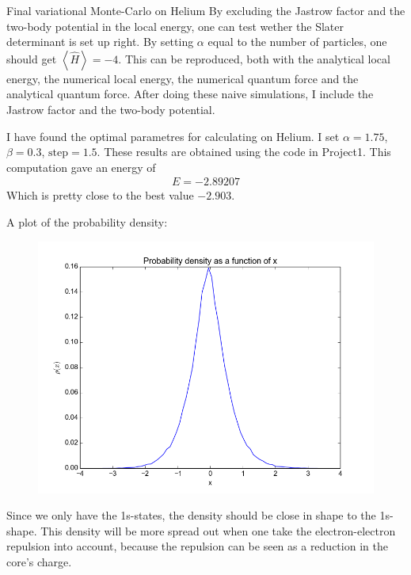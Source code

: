 \documentclass[a4paper, 12pt, titlepage]{article}
\begin{document}
\begin{section}{Final variational Monte-Carlo on Helium}
 By excluding the Jastrow factor and the two-body potential in the local energy, one can test wether the Slater determinant is set up right. By setting $\alpha$ equal to the number of particles, one should get $\left< \hat H \right> = -4$. This can be reproduced, both with the analytical local energy, the numerical local energy, the numerical quantum force and the analytical quantum force. After doing these naive simulations, I include the Jastrow factor and the two-body potential. 

 I have found the optimal parametres for calculating on Helium. I set $\alpha = 1.75$, $\beta = 0.3$, $\text{step} = 1.5$. These results are obtained using the code in Project1. This computation gave an energy of
 \begin{align*}
 	E = -2.89207
 \end{align*}
 Which is pretty close to the best value $-2.903$. 

 A plot of the probability density:
 \begin{figure}[H] 
 	\centering
 	\includegraphics[width=\textwidth]{../python_programs/ProbabilityDensity.png}
 \end{figure}
 Since we only have the 1s-states, the density should be close in shape to the 1s-shape. This density will be more spread out when one take the electron-electron repulsion into account, because the repulsion can be seen as a reduction in the core's charge. 


\end{section}
\end{document}

